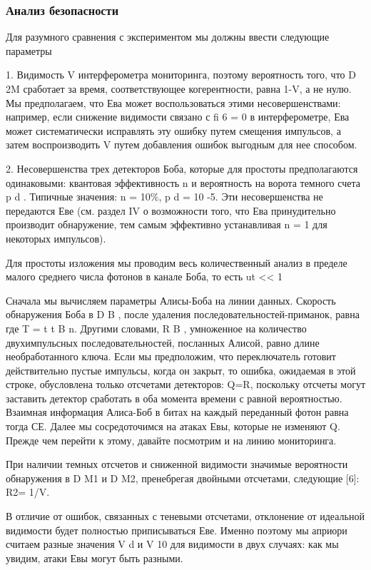 \subsubsection{Анализ безопасности}

Для разумного сравнения с экспериментом мы должны ввести следующие параметры

1. Видимость V интерферометра мониторинга, поэтому вероятность того, что D 2M сработает за время, соответствующее когерентности, равна 1-V, а не нулю. Мы предполагаем, что Ева может воспользоваться этими несовершенствами: например, если снижение видимости связано с fi 6 = 0 в интерферометре, Ева может систематически исправлять эту ошибку путем смещения импульсов, а затем воспроизводить V путем добавления ошибок выгодным для нее способом.

2. Несовершенства трех детекторов Боба, которые для простоты предполагаются одинаковыми: квантовая эффективность n и вероятность на ворота темного счета p d . Типичные значения: n = 10\%, p d = 10 -5. Эти несовершенства не передаются Еве (см. раздел IV о возможности того, что Ева принудительно производит обнаружение, тем самым эффективно устанавливая n = 1 для некоторых импульсов).

Для простоты изложения мы проводим весь количественный анализ в пределе малого среднего числа фотонов в канале Боба, то есть ut << 1

Сначала мы вычисляем параметры Алисы-Боба на линии данных. Скорость обнаружения Боба в D B , после удаления последовательностей-приманок, равна где T = t t B n. Другими словами, R B , умноженное на количество двухимпульсных последовательностей, посланных Алисой, равно длине необработанного ключа.
Если мы предположим, что переключатель готовит действительно пустые импульсы, когда он закрыт, то ошибка, ожидаемая в этой строке, обусловлена только отсчетами детекторов: Q=R, поскольку отсчеты могут заставить детектор сработать в оба момента времени с равной вероятностью. Взаимная информация Алиса-Боб в битах на каждый переданный фотон равна тогда СЕ. Далее мы сосредоточимся на атаках Евы, которые не изменяют Q. Прежде чем перейти к этому, давайте посмотрим и на линию мониторинга.

При наличии темных отсчетов и сниженной видимости значимые вероятности обнаружения в D M1 и D M2, пренебрегая двойными отсчетами, следующие [6]: R2= 1/V.

В отличие от ошибок, связанных с теневыми отсчетами, отклонение от идеальной видимости будет полностью приписываться Еве. Именно поэтому мы априори считаем разные значения V d и V 10 для видимости в двух случаях: как мы увидим, атаки Евы могут быть разными.

